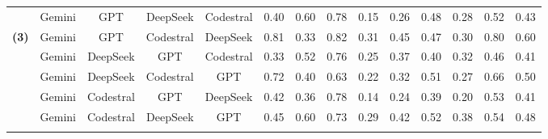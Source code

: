 \documentclass[authoryear,final,5p,times,twocolumn]{elsarticle}
\theoremstyle{plain}
\begin{document}
\begin{table}[p]
{\begin{tabular}{
>{\centering\arraybackslash}l
*{13}{>{\centering\arraybackslash}c}
}
& Gemini & GPT & DeepSeek & Codestral & \cellcolor{orange!16}0.40 & \cellcolor{orange!13}0.60 & \cellcolor{orange!10}0.78 & \cellcolor{red!13}0.15 & \cellcolor{orange!18}0.26 & \cellcolor{green!12}0.48 & \cellcolor{orange!19}0.28 & \cellcolor{orange!15}0.52 & \cellcolor{orange!17}0.43 \\
\hypertarget{case3}{\textbf{(3)}} & \cellcolor{blue!20}Gemini & \cellcolor{blue!20}GPT & \cellcolor{blue!20}Codestral & \cellcolor{blue!20}DeepSeek & \cellcolor{green!19}0.81 & \cellcolor{red!12}0.33 & \cellcolor{green!13}0.82 & \cellcolor{orange!12}0.31 & \cellcolor{green!13}0.45 & \cellcolor{green!12}0.47 & \cellcolor{orange!18}0.30 & \cellcolor{green!19}0.80 & \cellcolor{green!19}0.60 \label{Case:3}\\
& Gemini & DeepSeek & GPT & Codestral & \cellcolor{orange!19}0.33 & \cellcolor{orange!16}0.52 & \cellcolor{orange!11}0.76 & \cellcolor{orange!16}0.25 & \cellcolor{orange!11}0.37 & \cellcolor{orange!12}0.40 & \cellcolor{orange!16}0.32 & \cellcolor{orange!18}0.46 & \cellcolor{orange!19}0.41 \\
& Gemini & DeepSeek & Codestral & GPT & \cellcolor{green!16}0.72 & \cellcolor{red!10}0.40 & \cellcolor{red!12}0.63 & \cellcolor{orange!18}0.22 & \cellcolor{orange!14}0.32 & \cellcolor{green!15}0.51 & \cellcolor{red!10}0.27 & \cellcolor{green!12}0.66 & \cellcolor{orange!10}0.50 \\
& Gemini & Codestral & GPT & DeepSeek & \cellcolor{orange!16}0.42 & \cellcolor{red!11}0.36 & \cellcolor{orange!10}0.78 & \cellcolor{red!14}0.14 & \cellcolor{red!10}0.24 & \cellcolor{orange!13}0.39 & \cellcolor{red!14}0.20 & \cellcolor{orange!14}0.53 & \cellcolor{orange!19}0.41 \\
& Gemini & Codestral & DeepSeek & GPT & \cellcolor{orange!14}0.45 & \cellcolor{orange!13}0.60 & \cellcolor{orange!14}0.73 & \cellcolor{orange!14}0.29 & \cellcolor{green!11}0.42 & \cellcolor{green!15}0.52 & \cellcolor{orange!12}0.38 & \cellcolor{orange!14}0.54 & \cellcolor{orange!12}0.48 \\
\addlinespace[1.5ex]

\bottomrule
\end{tabular}
}
\end{table}
\end{document}
